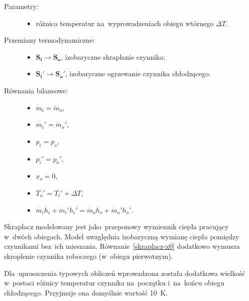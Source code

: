 \begin{description}

	\item[Parametry:] \hfill

		\begin{itemize}

			\item różnica temperatur na~wyprowadzeniach obiegu wtórnego
				$\Delta T$.

		\end{itemize}

	\item[Przemiany termodynamiczne:] \hfill

		\begin{itemize}

			\item $\mathbf{S_i} \rightarrow \mathbf{S_o}$,
				izobaryczne skraplanie czynnika;

			\item $\mathbf{S_i'} \rightarrow \mathbf{S_o'}$,
				izobaryczne ogrzewanie czynnika chłodzącego.

		\end{itemize}

	\item[Równania bilansowe:] \hfill

		\begin{itemize}

			\item \eq$\dot m_i = \dot m_o$,

			\item \eq$\dot m_i' = \dot m_o'$,

			\item \eq$p_i = p_o$,

			\item \eq$p_i' = p_o'$,

			\item \eq$x_o = 0$,%
				\label{skraplacz-x0}

			\item \eq$T_o' = T_i' + \Delta T$,%
				\label{skraplacz-DT}

			\item \eq$\dot m_i h_i + \dot m_i' h_i'
				= \dot m_o h_o + \dot m_o' h_o'$.

		\end{itemize}

\end{description}

Skraplacz modelowany jest jako~przeponowy wymiennik ciepła pracujący
w~dwóch obiegach. Model uwzględnia izobaryczną wymianę ciepła pomiędzy
czynnikami bez~ich mieszania. Równanie~\eqref{skraplacz-x0} dodatkowo
wymusza skroplenie czynnika roboczego (w~obiegu pierwotnym).

Dla~uproszczenia typowych obliczeń wprowadzona została dodatkowa
wielkość w~postaci różnicy temperatur czynnika na~początku i~na~końcu
obiegu chłodzącego. Przyjmuje ona domyślnie wartość \SI{10}{\kelvin}.
